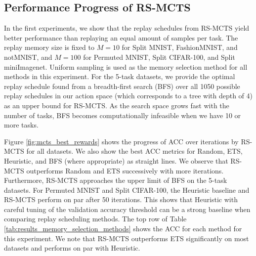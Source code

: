 
%


\subsection{Performance Progress of RS-MCTS}\label{sec:results_with_mcts}

In the first experiments, we show that the replay schedules from RS-MCTS yield better performance than replaying an equal amount of samples per task. 
The replay memory size is fixed to $M=10$ for Split MNIST, FashionMNIST, and notMNIST, and $M=100$ for Permuted MNIST, Split CIFAR-100, and Split miniImagenet. Uniform sampling is used as the memory selection method for all methods in this experiment.
For the 5-task datasets, we provide the optimal replay schedule found from a breadth-first search (BFS) over all 1050 possible replay schedules in our action space (which corresponds to a tree with depth of 4) as an upper bound for RS-MCTS. As the search space grows fast with the number of tasks, BFS becomes computationally infeasible when we have 10 or more tasks.



Figure \ref{fig:mcts_best_rewards} shows the progress of ACC over %
iterations by RS-MCTS for all datasets. We also show the best ACC metrics for Random, ETS, Heuristic, and BFS (where appropriate) as straight lines. We observe that RS-MCTS outperforms Random and ETS successively with more iterations. Furthermore, RS-MCTS approaches the upper limit of BFS on the 5-task datasets. For Permuted MNIST and Split CIFAR-100, the Heuristic baseline and RS-MCTS perform on par after 50 iterations. This shows that Heuristic with careful tuning of the validation accuracy threshold can be a strong baseline when comparing replay scheduling methods. The top row of Table \ref{tab:results_memory_selection_methods} shows the ACC for each method for this experiment. We note that RS-MCTS outperforms ETS significantly on most datasets and performs on par with Heuristic. 



